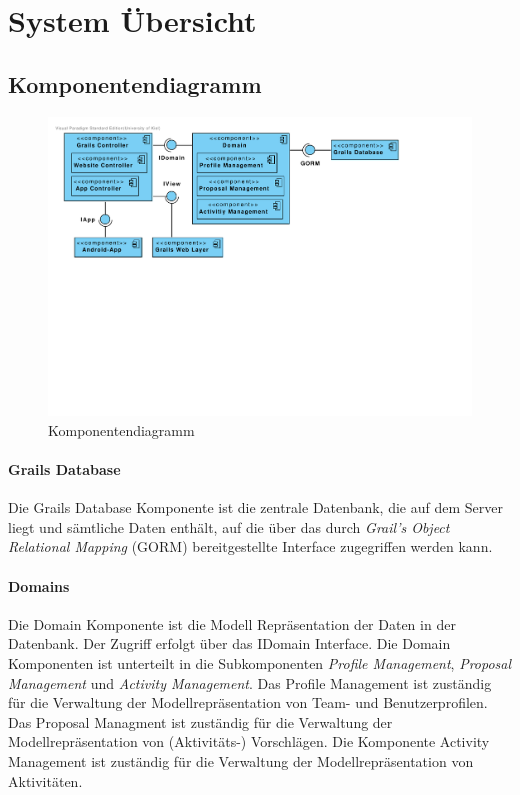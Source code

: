 \section{System \"Ubersicht}

\subsection{Komponentendiagramm}

\begin{figure}[H]
  \centering
  \includegraphics[width=\textwidth, clip]{gfx/component_diagram}
  \caption{Komponentendiagramm}
\end{figure}

\paragraph{Grails Database} Die Grails Database Komponente ist die
zentrale Datenbank, die auf dem Server liegt und s\"amtliche Daten
enth\"alt, auf die \"uber das durch \emph{Grail's Object
  Relational Mapping} (GORM) bereitgestellte Interface zugegriffen werden kann.

\paragraph{Domains} Die Domain Komponente ist die Modell
Repr\"asentation der Daten in der Datenbank. Der Zugriff erfolgt
\"uber das IDomain Interface. Die Domain Komponenten ist unterteilt in
die Subkomponenten \emph{Profile Management}, \emph{Proposal
  Management} und \emph{Activity Management}. Das Profile Management
ist zuständig für die Verwaltung der Modellrepräsentation von Team-
und Benutzerprofilen. Das Proposal Managment ist zuständig für die
Verwaltung der Modellrepräsentation von (Aktivitäts-) Vorschlägen. Die
Komponente Activity Management ist zuständig für die Verwaltung der Modellrepräsentation von Aktivitäten.

